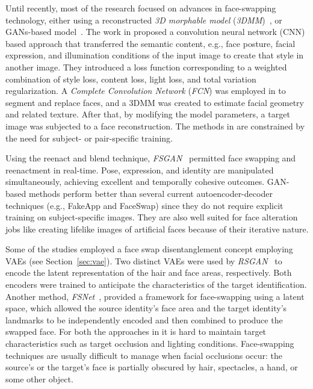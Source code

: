 \documentclass[preprint]{elsarticle}
\begin{document}
Until recently, most of the research focused on advances in face-swapping technology, either using a reconstructed \emph{3D morphable model} (\emph{3DMM})~\cite{irina,nirkin}, or GANs-based model~\cite{fsgan}. The work in \cite{irina} proposed a convolution neural network (CNN) based approach that transferred the semantic content, e.g., face posture, facial expression, and illumination conditions of the input image to create that style in another image. They introduced a loss function corresponding to a weighted combination of style loss, content loss, light loss, and total variation regularization.  A \emph{Complete Convolution Network} (\emph{FCN}) was employed in \cite{nirkin} to segment and replace faces, and a 3DMM was created to estimate facial geometry and related texture. After that, by modifying the model parameters, a target image was subjected to a face reconstruction. The methods in \cite{irina,nirkin} are constrained by the need for subject- or pair-specific training.


Using the reenact and blend technique, \emph{FSGAN}~\cite{fsgan} permitted face swapping and reenactment in real-time. Pose, expression, and identity are manipulated simultaneously, achieving excellent and temporally cohesive outcomes.  GAN-based methods  perform better than several current autoencoder-decoder techniques (e.g., FakeApp and FaceSwap) since they do not require explicit training on subject-specific images. They are also well suited for face alteration jobs like creating lifelike images of artificial faces because of their iterative nature.


Some of the studies employed a face swap disentanglement concept employing VAEs (see Section~\ref{sec:vae}). Two distinct VAEs were used by \emph{RSGAN}~\cite{rsgan} to encode the latent representation of the hair and face areas, respectively. Both encoders were trained to anticipate the characteristics of the target identification. Another method, \emph{FSNet}~\cite{fsnet}, provided a framework for face-swapping using a latent space, which allowed the source identity's face area and the target identity's landmarks to be independently encoded and then combined to produce the swapped face. For both the approaches in \cite{rsgan,fsnet} it is hard to maintain target characteristics such as target occlusion and lighting conditions. Face-swapping techniques are usually difficult to manage when facial occlusions occur: the source's or the target's face is partially obscured by hair, spectacles, a hand, or some other object.
\end{document}

